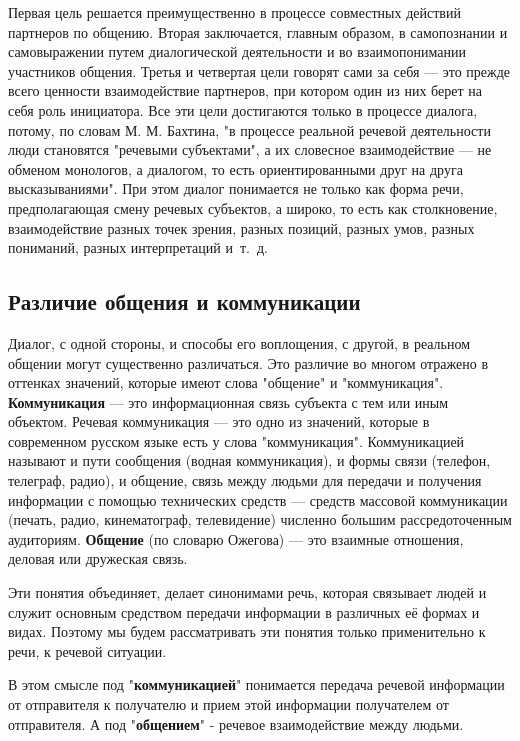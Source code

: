 Первая цель решается преимущественно в процессе совместных действий партнеров по общению.
Вторая заключается, главным образом, в самопознании и самовыражении путем диалогической деятельности и во взаимопонимании участников общения.
Третья и четвертая цели говорят сами за себя --- это прежде всего ценности взаимодействие партнеров, при котором один из них берет на себя роль инициатора.
Все эти цели достигаются только в процессе диалога, потому, по словам М. М. Бахтина, "в процессе реальной речевой деятельности люди становятся "речевыми субъектами", а их словесное взаимодействие --- не обменом монологов, а диалогом, то есть ориентированными друг на друга высказываниями".
При этом диалог понимается не только как форма речи, предполагающая смену речевых субъектов, а широко, то есть как столкновение, взаимодействие разных точек зрения, разных позиций, разных умов, разных пониманий, разных интерпретаций и~т.~д.

\subsection*{Различие общения и коммуникации}
 

Диалог, с одной стороны, и способы его воплощения, с другой, в реальном общении могут существенно различаться.
Это различие во многом отражено в оттенках значений, которые имеют слова "общение" и "коммуникация".
\textbf{Коммуникация} --- это информационная связь субъекта с тем или иным объектом.
Речевая коммуникация --- это одно из значений, которые в современном русском языке есть у слова "коммуникация".
Коммуникацией называют и пути сообщения (водная коммуникация), и формы связи (телефон, телеграф, радио), и общение, связь между людьми для передачи и получения информации с помощью технических средств --- средств массовой коммуникации (печать, радио, кинематограф, телевидение) численно большим рассредоточенным аудиториям.
\textbf{Общение} (по словарю Ожегова) --- это взаимные отношения, деловая или дружеская связь. 

Эти понятия объединяет, делает синонимами речь, которая связывает людей и служит основным средством передачи информации в различных её формах и видах. Поэтому мы будем рассматривать эти понятия только применительно к речи, к речевой ситуации.

В этом смысле под "\textbf{коммуникацией}" понимается передача речевой
информации от отправителя к получателю и прием этой информации получателем от отправителя. А под
"\textbf{общением}" - речевое взаимодействие между людьми.

